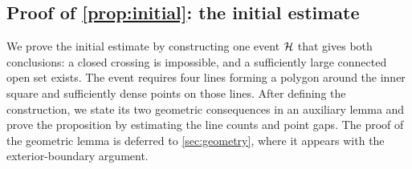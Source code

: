 \documentclass[11pt,letterpaper]{article}
\begin{document}
\subsection{Proof of \texorpdfstring{\cref{prop:initial}}{the initial estimate}: the initial estimate}
\label{sec:initial}

We prove the initial estimate by constructing one event $\mathcal H$ that gives both conclusions: a closed crossing is impossible, and a sufficiently large connected open set exists. The event requires four lines forming a polygon around the inner square and sufficiently dense points on those lines. After defining the construction, we state its two geometric consequences in an auxiliary lemma and prove the proposition by estimating the line counts and point gaps. The proof of the geometric lemma is deferred to \cref{sec:geometry}, where it appears with the exterior-boundary argument.
\end{document}
